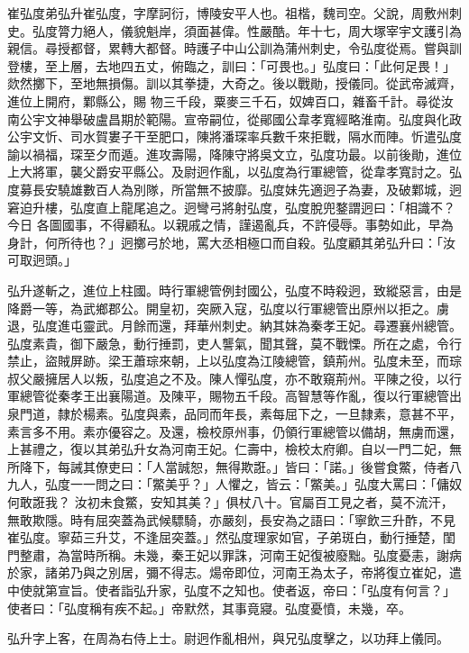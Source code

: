 \begin{pinyinscope}
 崔弘度弟弘升崔弘度，字摩訶衍，博陵安平人也。祖楷，魏司空。父說，周敷州刺史。弘度膂力絕人，儀貌魁岸，須面甚偉。性嚴酷。年十七，周大塚宰宇文護引為親信。尋授都督，累轉大都督。時護子中山公訓為蒲州刺史，令弘度從焉。嘗與訓登樓，至上層，去地四五丈，俯臨之，訓曰：「可畏也。」弘度曰：「此何足畏！」欻然擲下，至地無損傷。訓以其拳捷，大奇之。後以戰勛，授儀同。從武帝滅齊，進位上開府，鄴縣公，賜
 物三千段，粟麥三千石，奴婢百口，雜畜千計。尋從汝南公宇文神舉破盧昌期於範陽。宣帝嗣位，從鄖國公韋孝寬經略淮南。弘度與化政公宇文忻、司水賀婁子干至肥口，陳將潘琛率兵數千來拒戰，隔水而陣。忻遣弘度諭以禍福，琛至夕而遁。進攻壽陽，降陳守將吳文立，弘度功最。以前後勛，進位上大將軍，襲父爵安平縣公。及尉迥作亂，以弘度為行軍總管，從韋孝寬討之。弘度募長安驍雄數百人為別隊，所當無不披靡。弘度妹先適迥子為妻，及破鄴城，迥窘迫升樓，弘度直上龍尾追之。迥彎弓將射弘度，弘度脫兜鍪謂迥曰：「相識不？今日
 各圖國事，不得顧私。以親戚之情，謹遏亂兵，不許侵辱。事勢如此，早為身計，何所待也？」迥擲弓於地，罵大丞相極口而自殺。弘度顧其弟弘升曰：「汝可取迥頭。」



 弘升遂斬之，進位上柱國。時行軍總管例封國公，弘度不時殺迥，致縱惡言，由是降爵一等，為武鄉郡公。開皇初，突厥入寇，弘度以行軍總管出原州以拒之。虜退，弘度進屯靈武。月餘而還，拜華州刺史。納其妹為秦孝王妃。尋遷襄州總管。弘度素貴，御下嚴急，動行捶罰，吏人讋氣，聞其聲，莫不戰慄。所在之處，令行禁止，盜賊屏跡。梁王蕭琮來朝，上以弘度為江陵總管，鎮荊州。弘度未至，而琮
 叔父嚴擁居人以叛，弘度追之不及。陳人憚弘度，亦不敢窺荊州。平陳之役，以行軍總管從秦孝王出襄陽道。及陳平，賜物五千段。高智慧等作亂，復以行軍總管出泉門道，隸於楊素。弘度與素，品同而年長，素每屈下之，一旦隸素，意甚不平，素言多不用。素亦優容之。及還，檢校原州事，仍領行軍總管以備胡，無虜而還，上甚禮之，復以其弟弘升女為河南王妃。仁壽中，檢校太府卿。自以一門二妃，無所降下，每誡其僚吏曰：「人當誠恕，無得欺誑。」皆曰：「諾。」後嘗食鱉，侍者八九人，弘度一一問之曰：「鱉美乎？」人懼之，皆云：「鱉美。」弘度大罵曰：「傭奴何敢誑我？
 汝初未食鱉，安知其美？」俱杖八十。官屬百工見之者，莫不流汗，無敢欺隱。時有屈突蓋為武候驃騎，亦嚴刻，長安為之語曰：「寧飲三升酢，不見崔弘度。寧茹三升艾，不逢屈突蓋。」然弘度理家如官，子弟斑白，動行捶楚，閨門整肅，為當時所稱。未幾，秦王妃以罪誅，河南王妃復被廢黜。弘度憂恚，謝病於家，諸弟乃與之別居，彌不得志。煬帝即位，河南王為太子，帝將復立崔妃，遣中使就第宣旨。使者詣弘升家，弘度不之知也。使者返，帝曰：「弘度有何言？」使者曰：「弘度稱有疾不起。」帝默然，其事竟寢。弘度憂憤，未幾，卒。



 弘升字上客，在周為右侍上士。尉迥作亂相州，與兄弘度擊之，以功拜上儀同。




\end{pinyinscope}
